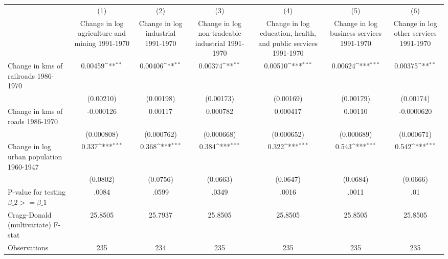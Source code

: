 {
\def\sym#1{\ifmmode^{#1}\else\(^{#1}\)\fi}
\begin{tabular}{l*{6}{c}}
\hline\hline
                &\multicolumn{1}{c}{(1)}&\multicolumn{1}{c}{(2)}&\multicolumn{1}{c}{(3)}&\multicolumn{1}{c}{(4)}&\multicolumn{1}{c}{(5)}&\multicolumn{1}{c}{(6)}\\
                &\multicolumn{1}{c}{Change in log agriculture and mining 1991-1970}&\multicolumn{1}{c}{Change in log industrial 1991-1970}&\multicolumn{1}{c}{Change in log non-tradeable industrial 1991-1970}&\multicolumn{1}{c}{Change in log education, health, and public services 1991-1970}&\multicolumn{1}{c}{Change in log business services 1991-1970}&\multicolumn{1}{c}{Change in log other services 1991-1970}\\
\hline
Change in kms of railroads 1986-1970&  0.00459\sym{**} &  0.00406\sym{**} &  0.00374\sym{**} &  0.00510\sym{***}&  0.00624\sym{***}&  0.00375\sym{**} \\
                &(0.00210)         &(0.00198)         &(0.00173)         &(0.00169)         &(0.00179)         &(0.00174)         \\
[1em]
Change in kms of roads 1986-1970&-0.000126         &  0.00117         & 0.000782         & 0.000417         &  0.00110         &-0.0000620         \\
                &(0.000808)         &(0.000762)         &(0.000668)         &(0.000652)         &(0.000689)         &(0.000671)         \\
[1em]
Change in log urban population 1960-1947&    0.337\sym{***}&    0.368\sym{***}&    0.384\sym{***}&    0.322\sym{***}&    0.543\sym{***}&    0.542\sym{***}\\
                & (0.0802)         & (0.0756)         & (0.0663)         & (0.0647)         & (0.0684)         & (0.0666)         \\
\hline
P-value for testing $\beta\_{2} >= \beta\_{1}$&    .0084         &    .0599         &    .0349         &    .0016         &    .0011         &      .01         \\
Cragg-Donald (multivariate) F-stat&  25.8505         &  25.7937         &  25.8505         &  25.8505         &  25.8505         &  25.8505         \\
Observations    &      235         &      234         &      235         &      235         &      235         &      235         \\
\hline\hline
\end{tabular}
}
